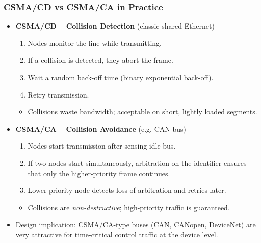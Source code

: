 \begin{frame}
	\frametitle{CSMA/CD vs CSMA/CA in Practice}
	\small
	\begin{itemize}
		\item \textbf{CSMA/CD – Collision Detection} (classic shared Ethernet)
		\begin{enumerate}
			\item Nodes monitor the line while transmitting.
			\item If a collision is detected, they abort the frame.
			\item Wait a random back-off time (binary exponential back-off).
			\item Retry transmission.
		\end{enumerate}
		\begin{itemize}
			\item Collisions waste bandwidth; acceptable on short, lightly loaded segments.
		\end{itemize}
		\item \textbf{CSMA/CA -- Collision Avoidance} (e.g. CAN bus)
		\begin{enumerate}
			\item Nodes start transmission after sensing idle bus.
			\item If two nodes start simultaneously, arbitration on the identifier
					ensures that only the higher-priority frame continues.
			\item Lower-priority node detects loss of arbitration and retries later.
		\end{enumerate}
		\begin{itemize}
			\item Collisions are \emph{non-destructive}; high-priority traffic is guaranteed.
		\end{itemize}
		\item Design implication: CSMA/CA-type buses (CAN, CANopen, DeviceNet) are very attractive
		for time-critical control traffic at the device level.
	\end{itemize}
\end{frame}


